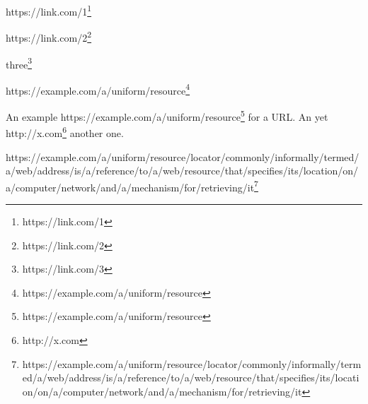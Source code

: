 


\vspace{\myLineheight}\begin{multicols}{2}\raggedcolumns{}

https://link.com/1\footnote{https://link.com/1}

{\mktsStyleUrl{}https:\g/\g/\g\allowbreak{}link.com/2\footnote{https://link.com/2}}

three\footnote{https://link.com/3}

{\mktsStyleUrl{}https:\g/\g/\g\allowbreak{}example.com\g/\g\allowbreak{}a\g/\g\allowbreak{}uniform\g/\g\allowbreak{}resource\footnote{https://example.com/a/uniform/resource}}

An example {\mktsStyleUrl{}https:\g/\g/\g\allowbreak{}example.com\g/\g\allowbreak{}a\g/\g\allowbreak{}uniform\g/\g\allowbreak{}resource\footnote{https://example.com/a/uniform/resource}} for a URL.
An yet http://x.com\footnote{http://x.com} another one.

{\mktsStyleUrl{}https:\g/\g/\g\allowbreak{}example.com\g/\g\allowbreak{}a\g/\g\allowbreak{}uniform\g/\g\allowbreak{}resource\g/\g\allowbreak{}locator\g/\g\allowbreak{}commonly\g/\g\allowbreak{}informally\g/\g\allowbreak{}termed\g/\g\allowbreak{}a\g/\g\allowbreak{}web\g/\g\allowbreak{}address\g/\g\allowbreak{}is\g/\g\allowbreak{}a\g/\g\allowbreak{}reference\g/\g\allowbreak{}to\g/\g\allowbreak{}a\g/\g\allowbreak{}web\g/\g\allowbreak{}resource\g/\g\allowbreak{}that\g/\g\allowbreak{}specifies\g/\g\allowbreak{}its\g/\g\allowbreak{}location\g/\g\allowbreak{}on\g/\g\allowbreak{}a\g/\g\allowbreak{}computer\g/\g\allowbreak{}network\g/\g\allowbreak{}and\g/\g\allowbreak{}a\g/\g\allowbreak{}mechanism\g/\g\allowbreak{}for\g/\g\allowbreak{}retrieving\g/\g\allowbreak{}it\footnote{https://example.com/a/uniform/resource/locator/commonly/informally/termed/a/web/address/is/a/reference/to/a/web/resource/that/specifies/its/location/on/a/computer/network/and/a/mechanism/for/retrieving/it}}
\end{multicols}




